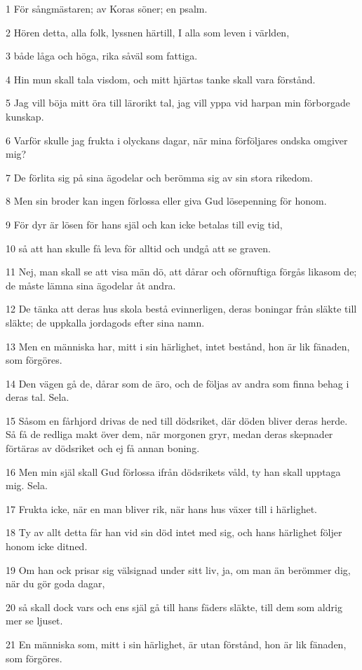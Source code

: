 \par 1 För sångmästaren; av Koras söner; en psalm.
\par 2 Hören detta, alla folk, lyssnen härtill, I alla som leven i världen,
\par 3 både låga och höga, rika såväl som fattiga.
\par 4 Hin mun skall tala visdom, och mitt hjärtas tanke skall vara förstånd.
\par 5 Jag vill böja mitt öra till lärorikt tal, jag vill yppa vid harpan min förborgade kunskap.
\par 6 Varför skulle jag frukta i olyckans dagar, när mina förföljares ondska omgiver mig?
\par 7 De förlita sig på sina ägodelar och berömma sig av sin stora rikedom.
\par 8 Men sin broder kan ingen förlossa eller giva Gud lösepenning för honom.
\par 9 För dyr är lösen för hans själ och kan icke betalas till evig tid,
\par 10 så att han skulle få leva för alltid och undgå att se graven.
\par 11 Nej, man skall se att visa män dö, att dårar och oförnuftiga förgås likasom de; de måste lämna sina ägodelar åt andra.
\par 12 De tänka att deras hus skola bestå evinnerligen, deras boningar från släkte till släkte; de uppkalla jordagods efter sina namn.
\par 13 Men en människa har, mitt i sin härlighet, intet bestånd, hon är lik fänaden, som förgöres.
\par 14 Den vägen gå de, dårar som de äro, och de följas av andra som finna behag i deras tal. Sela.
\par 15 Såsom en fårhjord drivas de ned till dödsriket, där döden bliver deras herde. Så få de redliga makt över dem, när morgonen gryr, medan deras skepnader förtäras av dödsriket och ej få annan boning.
\par 16 Men min själ skall Gud förlossa ifrån dödsrikets våld, ty han skall upptaga mig. Sela.
\par 17 Frukta icke, när en man bliver rik, när hans hus växer till i härlighet.
\par 18 Ty av allt detta får han vid sin död intet med sig, och hans härlighet följer honom icke ditned.
\par 19 Om han ock prisar sig välsignad under sitt liv, ja, om man än berömmer dig, när du gör goda dagar,
\par 20 så skall dock vars och ens själ gå till hans fäders släkte, till dem som aldrig mer se ljuset.
\par 21 En människa som, mitt i sin härlighet, är utan förstånd, hon är lik fänaden, som förgöres.

